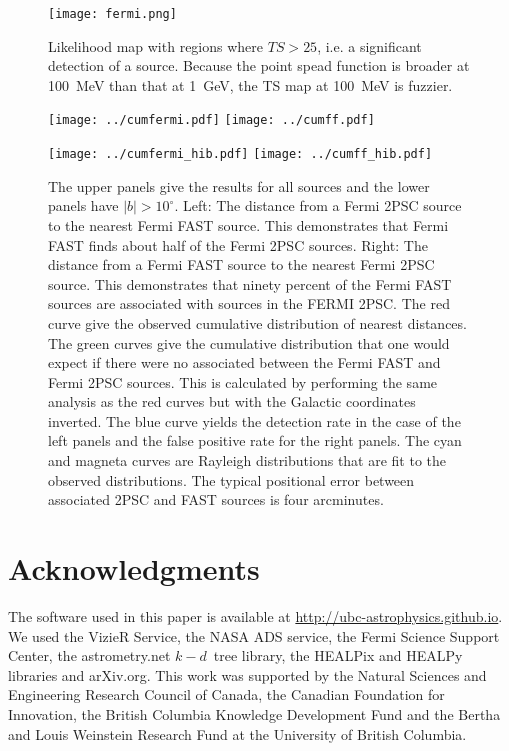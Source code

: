 \documentclass[useAMS,usenatbib]{mn2e}
\begin{document}
\begin{figure}
  \texttt{[image: fermi.png]}
  \caption{Likelihood map with regions where $TS>25$, i.e. a
    significant detection of a source.  Because the point spead
    function is broader at 100~MeV than that at 1~GeV, the TS map at 100~MeV
    is fuzzier.}
\end{figure}
\begin{figure}
\texttt{[image: ../cumfermi.pdf]}
\texttt{[image: ../cumff.pdf]}

\texttt{[image: ../cumfermi\_hib.pdf]}
\texttt{[image: ../cumff\_hib.pdf]}
\caption{The upper panels give the results for all sources and the lower panels have
  $|b|>10^\circ$.   Left: The distance from a Fermi 2PSC source to the nearest
  Fermi FAST source.  This demonstrates that Fermi FAST finds about
  half of the Fermi 2PSC sources.  Right: The distance from a Fermi
  FAST source to the nearest Fermi 2PSC source.  This demonstrates
  that ninety percent of the Fermi FAST sources are associated with
  sources in the FERMI 2PSC.  The red curve give the observed
  cumulative distribution of nearest distances.  The green curves give
  the cumulative distribution that one would expect if there were no
  associated between the Fermi FAST and Fermi 2PSC sources.  This is
  calculated by performing the same analysis as the red curves but
  with the Galactic coordinates inverted.  The blue curve yields the
  detection rate in the case of the left panels and the false positive
  rate for the right panels. The cyan and magneta curves are Rayleigh
  distributions that are fit to the observed distributions.  The
  typical positional error between associated 2PSC and FAST sources is
  four arcminutes.  }
\end{figure}

\section*{Acknowledgments}

The software used in this paper is available at
\url{http://ubc-astrophysics.github.io}.  We used the VizieR Service,
the NASA ADS service, the Fermi Science Support Center, the astrometry.net
$k-d$~tree library, the HEALPix and HEALPy libraries and arXiv.org. This work
was supported by the Natural Sciences and Engineering Research Council
of Canada, the Canadian Foundation for Innovation, the British
Columbia Knowledge Development Fund and the Bertha and Louis Weinstein
Research Fund at the University of British Columbia.





\label{lastpage}
\end{document}
